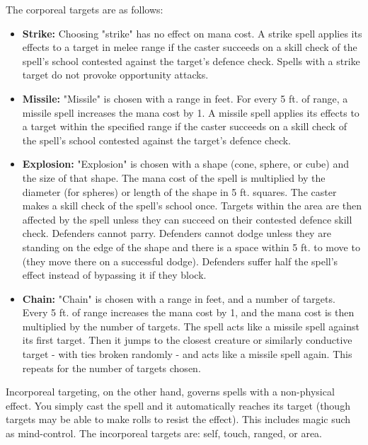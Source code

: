 The corporeal targets are as follows:
\begin{itemize}
    \item \textbf{Strike:} Choosing "strike" has no effect on mana cost. A
        strike spell applies its effects to a target in melee range if the
        caster succeeds on a skill check of the spell's school contested against
        the target's defence check. Spells with a strike target do not provoke
        opportunity attacks.
    \item \textbf{Missile:} "Missile" is chosen with a range in feet. For every
        5 ft. of range, a missile spell increases the mana cost by 1. A missile
        spell applies its effects to a target within the specified range if the
        caster succeeds on a skill check of the spell's school contested
        against the target's defence check.
    \item \textbf{Explosion:} "Explosion" is chosen with a shape (cone, sphere, or
        cube) and the size of that shape. The mana cost of the spell is multiplied
        by the diameter (for spheres) or length of the shape in 5 ft. squares.
        The caster makes a skill check of the spell's school once. Targets
        within the area are then affected by the spell unless they can succeed
        on their contested defence skill check. Defenders cannot parry.
        Defenders cannot dodge unless they are standing on the edge of the
        shape and there is a space within 5 ft. to move to (they move there on
        a successful dodge). Defenders suffer half the spell's effect instead
        of bypassing it if they block.
    \item \textbf{Chain:} "Chain" is chosen with a range in feet, and a number
        of targets. Every 5 ft. of range increases the mana cost by 1, and the
        mana cost is then multiplied by the number of targets. The spell acts
        like a missile spell against its first target. Then it jumps to the
        closest creature or similarly conductive target - with ties broken
        randomly - and acts like a missile spell again. This repeats for the
        number of targets chosen.
\end{itemize}

Incorporeal targeting, on the other hand, governs spells with a non-physical
effect. You simply cast the spell and it automatically reaches its target (though
targets may be able to make rolls to resist the effect). This includes magic
such as mind-control. The incorporeal targets are: self, touch, ranged, or
area.

